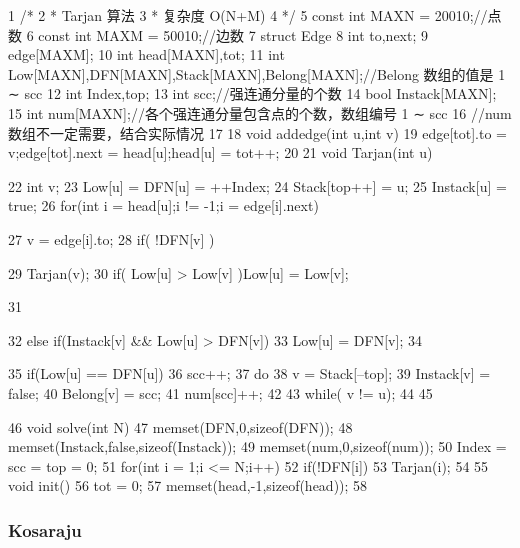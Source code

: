 \documentclass[11pt]{article}
\begin{document}
\begin{Code}
 1   /*
 2    * Tarjan 算法
 3    * 复杂度 O(N+M)
 4    */
 5   const int MAXN = 20010;//点数
 6   const int MAXM = 50010;//边数
 7   struct Edge{
 8       int to,next;
 9   }edge[MAXM];
10   int head[MAXN],tot;
11   int Low[MAXN],DFN[MAXN],Stack[MAXN],Belong[MAXN];//Belong 数组的值是
        1 ∼ scc
12   int Index,top;
13   int scc;//强连通分量的个数
14   bool Instack[MAXN];
15   int num[MAXN];//各个强连通分量包含点的个数，数组编号 1 ∼ scc
16   //num 数组不一定需要，结合实际情况
17
18 void addedge(int u,int v){
19     edge[tot].to = v;edge[tot].next = head[u];head[u] = tot++;
20 }
21 void Tarjan(int u){
22     int v;
23     Low[u] = DFN[u] = ++Index;
24     Stack[top++] = u;
25     Instack[u] = true;
26     for(int i = head[u];i != -1;i = edge[i].next){
27         v = edge[i].to;
28         if( !DFN[v] ){
29             Tarjan(v);
30             if( Low[u] > Low[v] )Low[u] = Low[v];


31              }
32              else if(Instack[v] && Low[u] > DFN[v])
33                  Low[u] = DFN[v];
34       }
35       if(Low[u] == DFN[u]){
36           scc++;
37           do{
38               v = Stack[--top];
39               Instack[v] = false;
40               Belong[v] = scc;
41               num[scc]++;
42           }
43           while( v != u);
44       }
45   }
46   void solve(int N){
47       memset(DFN,0,sizeof(DFN));
48       memset(Instack,false,sizeof(Instack));
49       memset(num,0,sizeof(num));
50       Index = scc = top = 0;
51       for(int i = 1;i <= N;i++)
52           if(!DFN[i])
53                Tarjan(i);
54   }
55   void init(){
56       tot = 0;
57       memset(head,-1,sizeof(head));
58   }
\end{Code}

\subsubsection{Kosaraju}
\end{document}
